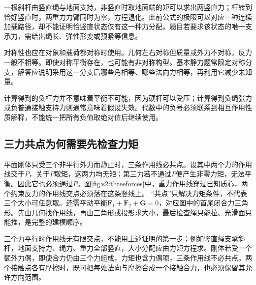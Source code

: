 一根斜杆由竖直绳与地面支持，非竖直时取地面端的矩可以求出两竖直力；杆转到恰好竖直时，两重力力臂同时为零，方程退化。此前公式的极限可以对应一种连续加载路径，却不能证明恰竖直状态仅有这一种力分配。题目若要求该状态的唯一支承力，需给出绳长、弹性形变或预紧等信息。

对称性也应在对象和载荷都对称时使用。几何左右对称但质量或外力不对称，反力一般不相等。即使对称平衡存在，也可能有非对称构型。基本静力题常限定对称分支，解答应说明采用这一分支后哪些角相等、哪些法向力相等，再利用它减少未知量。

计算得到的负杆力并不意味着平衡不可能，因为硬杆可以受压；计算得到负绳张力或负普通接触支持力则通常意味着假设失效。代数中的负号必须联系到相互作用性质解释，不能统一把所有负值取绝对值后继续使用。


\subsection{三力共点为何需要先检查力矩}
平面刚体只受三个非平行外力而静止时，三条作用线必共点。设其中两个力的作用线交于$P$，关于$P$取矩，这两力均无矩；第三力若不通过$P$便产生非零力矩，无法平衡。因此它也必须通过$P$。图\ref{fig:s2:threeforces}中，重力作用线穿过已知质心，两个约束反力的作用线交点必须落在这条竖线上。
“共点”只解决力矩条件，不代表三个大小可任意取。还需平动平衡$\boldsymbol F_1+\boldsymbol F_2+\boldsymbol G=0$，对应图中的首尾闭合力三角形。先由几何找作用线，再由三角形或投影求大小，最后检查绳只能拉、光滑面只能推，是完整的建模顺序。

三个力平行时作用线无有限交点，不能用上述证明的第一步；例如竖直绳支承斜杆，地面支持力、绳力、重力全部竖直，大小分配应由力矩方程求。刚体若受一个额外力偶，即使合力仍由三个力组成，力矩也含力偶项，三条作用线不必共点。两个接触点各有摩擦时，既可把每处法向与摩擦合成一个接触合力，也必须保留其允许方向范围。

